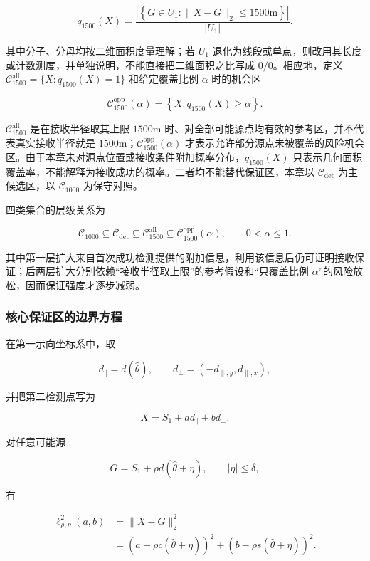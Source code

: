 \[
q_{1500}(X)
=
\frac{\left|\left\{G\in U_1:\lVert X-G\rVert_2\le1500\mathrm{m}\right\}\right|}{\lvert U_1\rvert}.
\]

其中分子、分母均按二维面积度量理解；若 $U_1$ 退化为线段或单点，则改用其长度或计数测度，并单独说明，不能直接把二维面积之比写成 $0/0$。相应地，定义 $\mathcal C_{1500}^{\mathrm{all}}=\{X:q_{1500}(X)=1\}$ 和给定覆盖比例 $\alpha$ 时的机会区

\[
\mathcal C_{1500}^{\mathrm{opp}}(\alpha)
=
\left\{X:q_{1500}(X)\ge\alpha\right\}.
\]

$\mathcal C_{1500}^{\mathrm{all}}$ 是在接收半径取其上限 $1500\mathrm{m}$ 时、对全部可能源点均有效的参考区，并不代表真实接收半径就是 $1500\mathrm{m}$；$\mathcal C_{1500}^{\mathrm{opp}}(\alpha)$ 才表示允许部分源点未被覆盖的风险机会区。由于本章未对源点位置或接收条件附加概率分布，$q_{1500}(X)$ 只表示几何面积覆盖率，不能解释为接收成功的概率。二者均不能替代保证区，本章以 $\mathcal C_{\det}$ 为主候选区，以 $\mathcal C_{1000}$ 为保守对照。

四类集合的层级关系为

\[
\mathcal C_{1000}
\subseteq
\mathcal C_{\det}
\subseteq
\mathcal C_{1500}^{\mathrm{all}}
\subseteq
\mathcal C_{1500}^{\mathrm{opp}}(\alpha),
\qquad 0<\alpha\le1.
\]

其中第一层扩大来自首次成功检测提供的附加信息，利用该信息后仍可证明接收保证；后两层扩大分别依赖“接收半径取上限”的参考假设和“只覆盖比例 $\alpha$”的风险放松，因而保证强度才逐步减弱。

\subsubsection{核心保证区的边界方程}

在第一示向坐标系中，取

\[
d_{\parallel}=d(\hat\theta),
\qquad
d_{\perp}=(-d_{\parallel,y},d_{\parallel,x}),
\]

并把第二检测点写为

\[
X=S_1+a d_{\parallel}+b d_{\perp}.
\]

对任意可能源

\[
G=S_1+\rho d(\hat\theta+\eta),
\qquad
|\eta|\le\delta,
\]

有

\[
\begin{aligned}
\ell_{\rho,\eta}^2(a,b)
&=\lVert X-G\rVert_2^2\\
&=\left(a-\rho c(\hat\theta+\eta)\right)^2+\left(b-\rho s(\hat\theta+\eta)\right)^2.
\end{aligned}
\]

